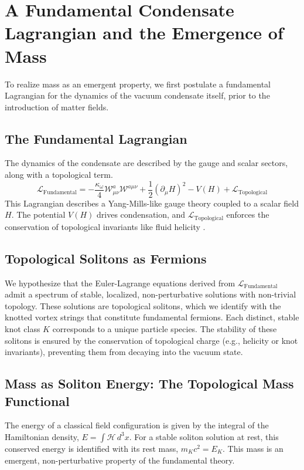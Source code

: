 \documentclass[a4paper,12pt]{article}
\begin{document}
    \section{A Fundamental Condensate Lagrangian and the Emergence of Mass}
    \label{sec:mass_emergence}

    To realize mass as an emergent property, we first postulate a fundamental Lagrangian for the dynamics of the vacuum condensate itself, prior to the introduction of matter fields.

    \subsection{The Fundamental Lagrangian}
    The dynamics of the condensate are described by the gauge and scalar sectors, along with a topological term.
    \begin{equation}
        \mathcal{L}_{\text{Fundamental}} = -\frac{\kappa_\omega}{4} \mathcal{W}_{\mu\nu}^a \mathcal{W}^{a \mu\nu} + \frac{1}{2}(\partial_\mu H)^2 - V(H) + \mathcal{L}_{\text{Topological}}
    \end{equation}
    This Lagrangian describes a Yang-Mills-like gauge theory coupled to a scalar field $H$. The potential $V(H)$ drives condensation, and $\mathcal{L}_{\text{Topological}}$ enforces the conservation of topological invariants like fluid helicity \cite{Moffatt1969, Arnold1998}.

    \subsection{Topological Solitons as Fermions}
    We hypothesize that the Euler-Lagrange equations derived from $\mathcal{L}_{\text{Fundamental}}$ admit a spectrum of stable, localized, non-perturbative solutions with non-trivial topology. These solutions are topological solitons, which we identify with the knotted vortex strings that constitute fundamental fermions. Each distinct, stable knot class $K$ corresponds to a unique particle species. The stability of these solitons is ensured by the conservation of topological charge (e.g., helicity or knot invariants), preventing them from decaying into the vacuum state.

    \subsection{Mass as Soliton Energy: The Topological Mass Functional}
    The energy of a classical field configuration is given by the integral of the Hamiltonian density, $E = \int \mathcal{H} \, d^3x$. For a stable soliton solution at rest, this conserved energy is identified with its rest mass, $m_K c^2 = E_K$. This mass is an emergent, non-perturbative property of the fundamental theory.
\end{document}
